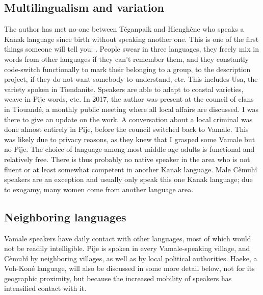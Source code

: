  \subsection{Multilingualism and variation}
 \label{sec:Multiling}
 The author has met no-one between Téganpaik and Hienghène who speaks a Kanak language since birth without speaking another one. This is one of the first things someone will tell you: . People swear in three languages, they freely mix in words from other languages if they can't remember them, and they constantly code-switch functionally to mark their belonging to a group, to the description project, if they do not want somebody to understand, etc. This includes Usa, the variety spoken in Tiendanite. Speakers are able to adapt to coastal varieties, weave in Pije words, etc. In 2017, the author was present at the council of clans in Tiouandé, a monthly public meeting where all local affairs are discussed. I was there to give an update on the work. A conversation about a local criminal was done almost entirely in Pije, before the council switched back to Vamale. %
 This was likely due to privacy reasons, as they knew that I grasped some Vamale but no Pije. The choice of language among most middle age adults is functional and relatively free. There is thus probably no native speaker in the area who is not fluent or at least somewhat competent in another Kanak language. Male Cèmuhî speakers are an exception and usually only speak this one Kanak language; due to exogamy, many women come from another language area.
 
 \subsection{Neighboring languages}
 \label{ssec:neighbors}
 Vamale speakers have daily contact with other languages, most of which would not be readily intelligible. Pije is spoken in every Vamale-speaking village, and Cèmuhî by neighboring villages, as well as by local political authorities. Haeke, a Voh-Koné language, will also be discussed in some more detail below, not for its geographic proximity, but because the increased mobility of speakers has intensified contact with it. %
 
